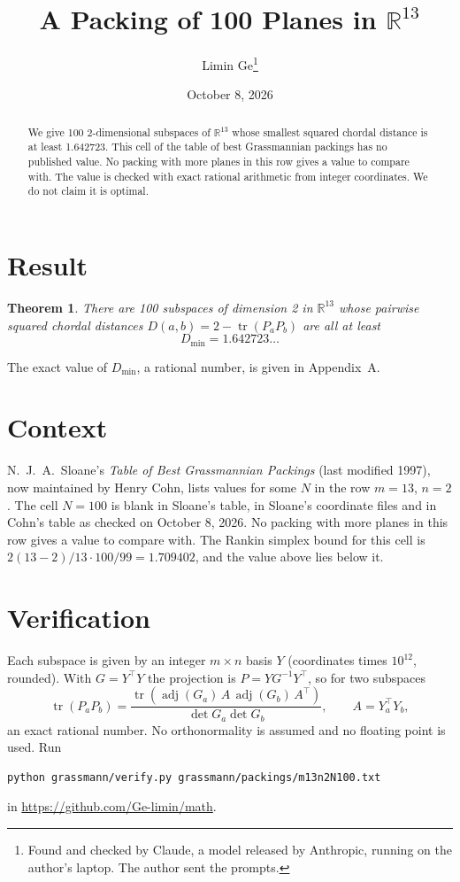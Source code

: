 \documentclass[11pt,a4paper]{article}
\title{A Packing of 100 Planes in $\mathbb{R}^{13}$}
\author{Limin Ge\thanks{Found and checked by Claude, a model released by Anthropic, running on the author's laptop. The author sent the prompts.}}
\date{October 8, 2026}
\newtheorem*{theorem}{Theorem}
\begin{document}
\maketitle
\begin{abstract}
We give 100 2-dimensional subspaces of $\mathbb{R}^{13}$ whose smallest squared chordal distance is at least 1.642723. This cell of the table of best Grassmannian packings has no published value. No packing with more planes in this row gives a value to compare with. The value is checked with exact rational arithmetic from integer coordinates. We do not claim it is optimal.
\end{abstract}

\section{Result}
\begin{theorem}
There are 100 subspaces of dimension 2 in $\mathbb{R}^{13}$ whose pairwise squared chordal distances $D(a,b) = 2 - \operatorname{tr}(P_aP_b)$ are all at least
\[ D_{\min} = 1.642723\ldots \]
\end{theorem}
The exact value of $D_{\min}$, a rational number, is given in Appendix~A.


\section{Context}
N.~J.~A.~Sloane's \emph{Table of Best Grassmannian Packings} (last modified 1997), now maintained by Henry Cohn, lists values for some $N$ in the row $m=13$, $n=2$. The cell $N=100$ is blank in Sloane's table, in Sloane's coordinate files and in Cohn's table as checked on October 8, 2026. No packing with more planes in this row gives a value to compare with. The Rankin simplex bound for this cell is $2(13-2)/13\cdot 100/99 = 1.709402$, and the value above lies below it.


\section{Verification}
Each subspace is given by an integer $m\times n$ basis $Y$ (coordinates times $10^{12}$, rounded). With $G=Y^\top Y$ the projection is $P=YG^{-1}Y^\top$, so for two subspaces
\[ \operatorname{tr}(P_aP_b)=\frac{\operatorname{tr}(\operatorname{adj}(G_a)\,A\,\operatorname{adj}(G_b)\,A^\top)}{\det G_a\det G_b},\qquad A=Y_a^\top Y_b, \]
an exact rational number. No orthonormality is assumed and no floating point is used. Run
\begin{verbatim}
python grassmann/verify.py grassmann/packings/m13n2N100.txt
\end{verbatim}
in \url{https://github.com/Ge-limin/math}.
\end{document}
